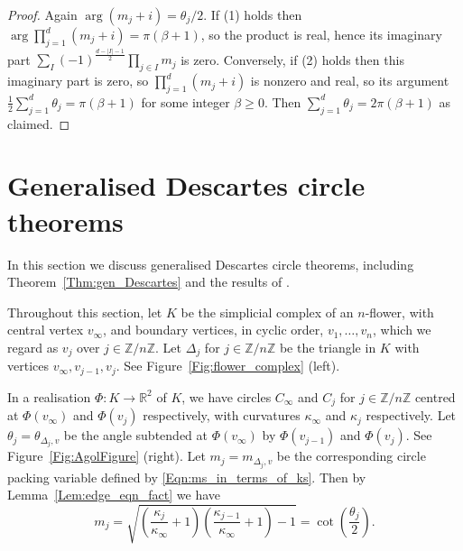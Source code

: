 \documentclass[12pt]{amsart}
\numberwithin{equation}{section}
\theoremstyle{named}
\newcommand{\reffig}[1]{Figure~\ref{Fig:#1}}
\newcommand{\refeqn}[1]{\eqref{Eqn:#1}}
\newcommand{\reflem}[1]{Lemma~\ref{Lem:#1}}
\newcommand{\refthm}[1]{Theorem~\ref{Thm:#1}}
\newcommand{\R}{\mathbb{R}}
\newcommand{\Z}{\mathbb{Z}}
\newcommand{\To}{\longrightarrow}
\begin{document}
\begin{proof}
Again $\arg(m_j + i) = \theta_j / 2$. If (1) holds then $\arg \prod_{j=1}^d (m_j + i) = \pi (\beta + 1)$, so the product is real, hence its imaginary part $\sum_{I} (-1)^{\frac{ d-|I|-1 }{2} } \prod_{j \in I} m_{j}$ is zero. Conversely, if (2) holds then this imaginary part is zero, so $\prod_{j=1}^d (m_j + i)$ is nonzero and real, so its argument $\frac{1}{2} \sum_{j=1}^d \theta_j = \pi (\beta + 1)$ for some integer $\beta \geq 0$. Then $\sum_{j=1}^d \theta_j = 2\pi (\beta+1)$ as claimed.
\end{proof}


\section{Generalised Descartes circle theorems}
\label{Sec:Descartes}

In this section we discuss generalised Descartes circle theorems, including \refthm{gen_Descartes} and the results of \cite{MZ25}.

Throughout this section, let $K$ be the simplicial complex of an $n$-flower, with central vertex $v_\infty$, and boundary vertices, in cyclic order, $v_1, \ldots, v_n$, which we regard as $v_j$ over $j \in \Z/n\Z$. Let $\Delta_j$ for $j \in \Z/n\Z$ be the triangle in $K$ with vertices $v_\infty, v_{j-1}, v_j$. See \reffig{flower_complex} (left). 

In a realisation $\Phi \colon K \To \R^2$ of $K$, we have circles $C_\infty$ and $C_j$ for $j \in \Z/n\Z$ centred at $\Phi(v_\infty)$ and $\Phi(v_j)$ respectively, with curvatures $\kappa_\infty$ and $\kappa_j$ respectively. Let $\theta_j = \theta_{\Delta_j,v}$ be the angle subtended at $\Phi(v_\infty)$ by $\Phi(v_{j-1})$ and $\Phi(v_j)$. See \reffig{AgolFigure} (right). Let $m_j = m_{\Delta_j,v}$ be the corresponding circle packing variable defined by \refeqn{ms_in_terms_of_ks}. Then by \reflem{edge_eqn_fact} we have
\[
m_j = \sqrt{ \left( \frac{\kappa_j}{\kappa_\infty} + 1 \right) \left( \frac{\kappa_{j-1}}{\kappa_\infty} + 1 \right) - 1} = \cot \left( \frac{\theta_j}{2} \right).
\]
\end{document}
